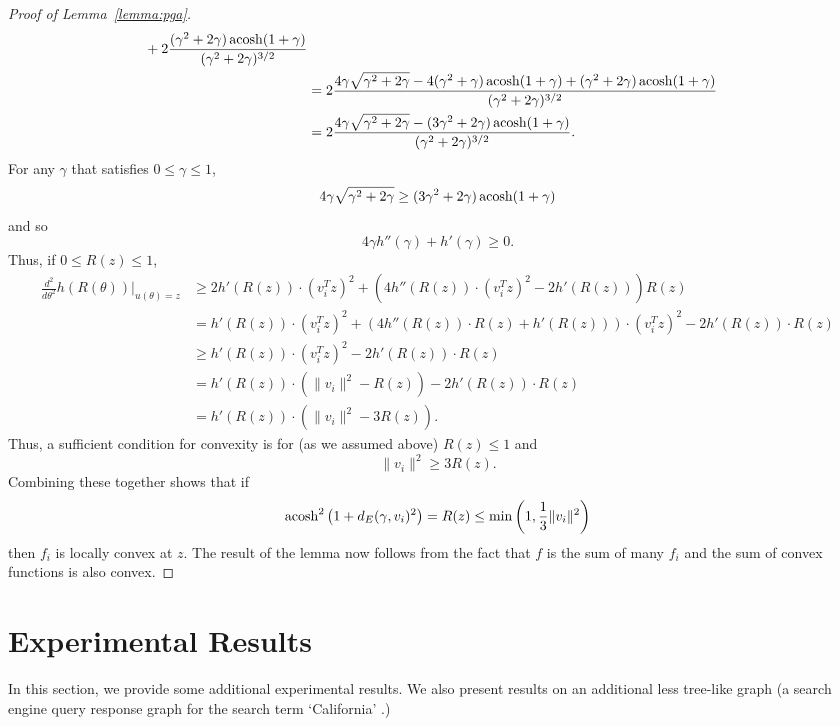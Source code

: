 \begin{proof}[Proof of Lemma~\ref{lemma:pga}]
\begin{align*}
{  }
  +
  2 \frac{
    (\gamma^2 + 2\gamma) \operatorname{acosh}(1+\gamma)
  }{
    (\gamma^2 + 2\gamma)^{3/2}
  } \\
  &=
  2 \frac{
    4 \gamma \sqrt{\gamma^2 + 2\gamma}
    -
    4 (\gamma^2 + \gamma) \operatorname{acosh}(1 + \gamma)
    +
    (\gamma^2 + 2\gamma) \operatorname{acosh}(1+\gamma)
  }{
    (\gamma^2 + 2\gamma)^{3/2}
  } \\
  &=
  2 \frac{
    4 \gamma \sqrt{\gamma^2 + 2\gamma}
    -
    (3 \gamma^2 + 2 \gamma) \operatorname{acosh}(1 + \gamma)
  }{
    (\gamma^2 + 2\gamma)^{3/2}
  }.
\end{align*}
For any $\gamma$ that satisfies $0 \le \gamma \le 1$,
\[
  4 \gamma \sqrt{\gamma^2 + 2\gamma}
  \ge
  (3 \gamma^2 + 2 \gamma) \operatorname{acosh}(1 + \gamma)
\]
and so
\[
  4 \gamma h''(\gamma) + h'(\gamma) \ge 0.
\]
Thus, if $0 \le R(z) \le 1$,
\begin{align*}
  \frac{d^2}{d \theta^2} h(R(\theta)) \big|_{u(\theta) = z}
  &\ge
  2 h'(R(z)) \cdot (v_i^T z)^2 
  +
  \left(
    4 h''(R(z)) \cdot (v_i^T z)^2
    -
    2 h'(R(z))
  \right)
  R(z) \\
  &=
  h'(R(z)) \cdot (v_i^T z)^2 
  +
  \left(
    4 h''(R(z)) \cdot R(z)
    +
    h'(R(z))
  \right) \cdot (v_i^T z)^2 
  -
  2 h'(R(z)) \cdot R(z) \\
  &\ge
  h'(R(z)) \cdot (v_i^T z)^2 
  -
  2 h'(R(z)) \cdot R(z) \\
  &=
  h'(R(z)) \cdot \left( \| v_i \|^2 - R(z) \right)
  -
  2 h'(R(z)) \cdot R(z) \\
  &=
  h'(R(z)) \cdot \left( \| v_i \|^2 - 3 R(z) \right).
\end{align*}
Thus, a sufficient condition for convexity is for (as we assumed above) $R(z) \le 1$ and
\[
  \| v_i \|^2 \ge 3 R(z).
\]
Combining these together shows that if
\[
  \operatorname{acosh}^2\left(1 + d_E(\gamma, v_i)^2 \right)
  =
  R(z)
  \le
  \min\left(1, \frac{1}{3} \| v_i \|^2 \right)
\]
then $f_i$ is locally convex at $z$.
The result of the lemma now follows from the fact that $f$ is the sum of many $f_i$ and the sum of convex functions is also convex.
\end{proof}

\section{Experimental Results}
In this section, we provide some additional experimental results. We also present results on an additional less tree-like graph (a search engine query response graph for the search term `California' \cite{ca-data}.)
 
